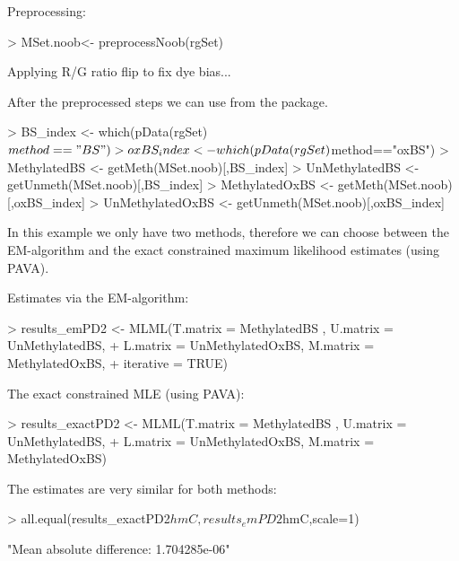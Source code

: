 \documentclass{article}
\begin{document}
Preprocessing:
\begin{Schunk}
\begin{Sinput}
> MSet.noob<- preprocessNoob(rgSet)
\end{Sinput}
\begin{Soutput}
[preprocessNoob] Applying R/G ratio flip to fix dye bias...
\end{Soutput}
\end{Schunk}


After the preprocessed steps we can use  from the  package.


\begin{Schunk}
\begin{Sinput}
> BS_index <- which(pData(rgSet)$method=="BS")
> oxBS_index <- which(pData(rgSet)$method=="oxBS")
> MethylatedBS <- getMeth(MSet.noob)[,BS_index]
> UnMethylatedBS <- getUnmeth(MSet.noob)[,BS_index]
> MethylatedOxBS <- getMeth(MSet.noob)[,oxBS_index]
> UnMethylatedOxBS <- getUnmeth(MSet.noob)[,oxBS_index]
\end{Sinput}
\end{Schunk}



In this example we only have two methods, therefore we can choose between the EM-algorithm and the exact constrained maximum likelihood estimates (using PAVA).

Estimates via the EM-algorithm:

\begin{Schunk}
\begin{Sinput}
> results_emPD2 <- MLML(T.matrix = MethylatedBS , U.matrix = UnMethylatedBS,
+                    L.matrix = UnMethylatedOxBS, M.matrix = MethylatedOxBS,
+                    iterative = TRUE)
\end{Sinput}
\end{Schunk}


The exact constrained MLE (using PAVA):

\begin{Schunk}
\begin{Sinput}
> results_exactPD2 <- MLML(T.matrix = MethylatedBS , U.matrix = UnMethylatedBS,
+                       L.matrix = UnMethylatedOxBS, M.matrix = MethylatedOxBS)
\end{Sinput}
\end{Schunk}

The estimates are very similar for both methods:
\begin{Schunk}
\begin{Sinput}
> all.equal(results_exactPD2$hmC,results_emPD2$hmC,scale=1)
\end{Sinput}
\begin{Soutput}
[1] "Mean absolute difference: 1.704285e-06"
\end{Soutput}
\end{Schunk}
\end{document}
